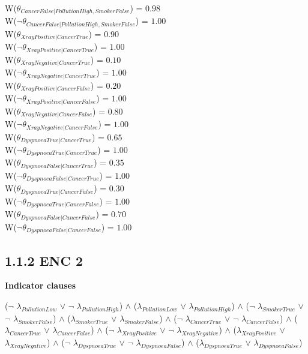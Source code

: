 \documentclass[a4paper,10pt]{report}
\begin{document}
W($\theta_{CancerFalse|PollutionHigh,SmokerFalse}$) = $0.98$\\ 
W($\neg\theta_{CancerFalse|PollutionHigh,SmokerFalse}$) = $1.00$\\ 
W($\theta_{XrayPositive|CancerTrue}$) = $0.90$\\ 
W($\neg\theta_{XrayPositive|CancerTrue}$) = $1.00$\\ 
W($\theta_{XrayNegative|CancerTrue}$) = $0.10$\\ 
W($\neg\theta_{XrayNegative|CancerTrue}$) = $1.00$\\ 
W($\theta_{XrayPositive|CancerFalse}$) = $0.20$\\ 
W($\neg\theta_{XrayPositive|CancerFalse}$) = $1.00$\\ 
W($\theta_{XrayNegative|CancerFalse}$) = $0.80$\\ 
W($\neg\theta_{XrayNegative|CancerFalse}$) = $1.00$\\ 
W($\theta_{DyspnoeaTrue|CancerTrue}$) = $0.65$\\ 
W($\neg\theta_{DyspnoeaTrue|CancerTrue}$) = $1.00$\\ 
W($\theta_{DyspnoeaFalse|CancerTrue}$) = $0.35$\\ 
W($\neg\theta_{DyspnoeaFalse|CancerTrue}$) = $1.00$\\ 
W($\theta_{DyspnoeaTrue|CancerFalse}$) = $0.30$\\ 
W($\neg\theta_{DyspnoeaTrue|CancerFalse}$) = $1.00$\\ 
W($\theta_{DyspnoeaFalse|CancerFalse}$) = $0.70$\\ 
W($\neg\theta_{DyspnoeaFalse|CancerFalse}$) = $1.00$\\ 
	
\subsection*{1.1.2 ENC 2}
\textbf{Indicator clauses}\\
\begin{center}
	($\neg$ $\lambda_{PollutionLow}$ $\lor$ $\neg$ $\lambda_{PollutionHigh}$) $\land$ 
($\lambda_{PollutionLow}$ $\lor$ $\lambda_{PollutionHigh}$) $\land$ 
($\neg$ $\lambda_{SmokerTrue}$ $\lor$ $\neg$ $\lambda_{SmokerFalse}$) $\land$ 
($\lambda_{SmokerTrue}$ $\lor$ $\lambda_{SmokerFalse}$) $\land$ 
($\neg$ $\lambda_{CancerTrue}$ $\lor$ $\neg$ $\lambda_{CancerFalse}$) $\land$ 
($\lambda_{CancerTrue}$ $\lor$ $\lambda_{CancerFalse}$) $\land$ 
($\neg$ $\lambda_{XrayPositive}$ $\lor$ $\neg$ $\lambda_{XrayNegative}$) $\land$ 
($\lambda_{XrayPositive}$ $\lor$ $\lambda_{XrayNegative}$) $\land$ 
($\neg$ $\lambda_{DyspnoeaTrue}$ $\lor$ $\neg$ $\lambda_{DyspnoeaFalse}$) $\land$ 
($\lambda_{DyspnoeaTrue}$ $\lor$ $\lambda_{DyspnoeaFalse}$)
\end{center}
\end{document}
